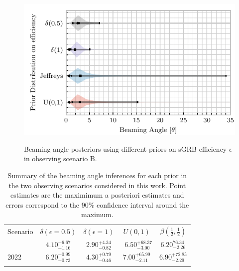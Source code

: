 \documentclass[twocolumn,nofootinbib]{revtex4-1}
\begin{document}
\begin{figure}
\centering
{\includegraphics[width=\linewidth]{O2_beaming_posteriors_violin.pdf}}
\caption{Beaming angle posteriors using different priors on \ac{sGRB} efficiency $\epsilon$ in observing scenario B.
    \label{fig:jetposterior2022}}
\end{figure}

\begin{table}
\centering
\begin{tabular}{l c c c c }
\toprule
Scenario & $\delta(\epsilon=0.5)$ & $\delta(\epsilon=1)$ & $U(0,1)$ & $\beta(\frac{1}{2},\frac{1}{2})$\\
\cline{1-1}\cline{2-5}
\colrule
2016  & $4.10^{+6.67}_{-1.16}$ & $2.90^{+4.34}_{-0.82}$ &\ $6.50^{+68.37}_{-3.00}$ & $6.20^{76.34}_{-2.26}$ \\
2022 & $6.20^{+0.99}_{-0.73}$ & $4.30^{+0.79}_{-0.46}$ & $7.00^{+65.99}_{-2.11}$ & $6.90^{+72.85}_{-2.29}$ \\
\botrule
\end{tabular}
\caption{Summary of the beaming angle inferences for each prior in the two observing scenarios considered in this work.
    Point estimates are the maximimum a posteriori estimates and errors correspond to the $90\%$ confidence interval around the maximum.
    \label{table:aligo_beam_inference}}
\end{table}

%
\end{document}
